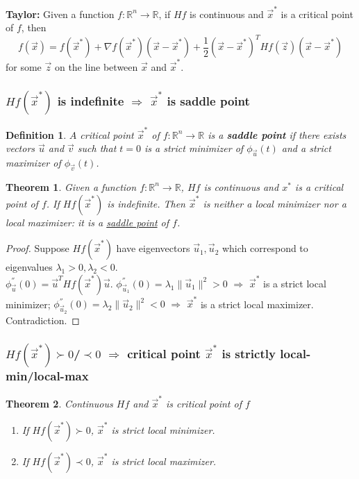 \documentclass[11pt,a4paper]{article}
\newtheorem{theorem}{Theorem}
\newtheorem{definition}{Definition}
\begin{document}
\textbf{Taylor:} Given a function $f:\mathbb{R}^n \rightarrow \mathbb{R}$, if $Hf$ is continuous and $\vec{x}^*$ is a critical point of $f$, then
$$f(\vec{x})=f(\vec{x}^*)+\nabla f(\vec{x}^*)(\vec{x}-\vec{x}^*)+\frac{1}{2}(\vec{x}-\vec{x}^*)^T Hf(\vec{z}) (\vec{x}-\vec{x}^*)$$
for some $\vec{z}$ on the line between $\vec{x}$ and $\vec{x}^*$.


\subsubsection{$Hf(\vec{x}^*)$ is indefinite $\Rightarrow$ $\vec{x}^*$ is saddle point}

\begin{definition}
    $A$ critical point $\vec{x}^*$ of $f: \mathbb{R}^n \rightarrow \mathbb{R}$ is a \textbf{saddle point} if there exists vectors $\vec{u}$ and $\vec{v}$ such that $t=0$ is a strict minimizer of $\phi_{\vec{u}}(t)$ and a strict maximizer of $\phi_{\vec{v}}(t)$.
    \end{definition}

\begin{theorem}
    Given a function $f:\mathbb{R}^n \rightarrow \mathbb{R}$, $Hf$ is continuous and $x^*$ is a critical point of
    $f$. If $Hf(\vec{x}^*)$ is indefinite. Then $\vec{x}^*$ is neither a local minimizer nor a local maximizer: it is a \underline{saddle point} of $f$.
\end{theorem}
\begin{proof}
    Suppose $Hf(\vec{x}^*)$ have eigenvectors $\vec{u}_1,\vec{u}_2$  which correspond to eigenvalues $\lambda_1>0,\lambda_2<0$.\\
    $\phi^{''}_{\vec{u}}(0)=\vec{u}^T {Hf}(\vec{x}^*)\vec{u}$. $\phi^{''}_{\vec{u}_1}(0)=\lambda_1\|\vec{u}_1\|^2>0$ $\Rightarrow$ $\vec{x}^*$ is a strict local minimizer; $\phi^{''}_{\vec{u}_2}(0)=\lambda_2\|\vec{u}_2\|^2<0$ $\Rightarrow$ $\vec{x}^*$ is a strict local maximizer. Contradiction.
\end{proof}

\subsubsection{$Hf(\vec{x}^*)\succ 0$/$\prec 0$ $\Rightarrow$ critical point $\vec{x}^*$ is strictly local-min/local-max}
\begin{theorem} Continuous $Hf$ and $\vec{x}^*$ is critical point of $f$
    \begin{enumerate}
        \item If $Hf(\vec{x}^*)\succ 0$, $\vec{x}^*$ is strict local minimizer.
        \item If $Hf(\vec{x}^*)\prec 0$, $\vec{x}^*$ is strict local maximizer.
    \end{enumerate}
    \end{theorem}
    
\end{document}
